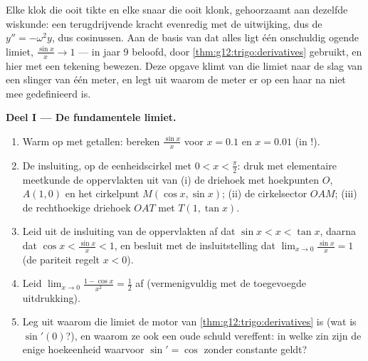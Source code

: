 \begin{problem}
\label{pb:g12:trigo:1}
Elke klok die ooit tikte en elke snaar die ooit klonk, gehoorzaamt aan
dezelfde wiskunde: een terugdrijvende kracht evenredig met de uitwijking, dus
de  $y'' = -\omega^2 y$, dus cosinussen. Aan de basis van dat
alles ligt één onschuldig ogende limiet, $\frac{\sin x}{x} \to 1$ --- in jaar
9 beloofd, door \cref{thm:g12:trigo:derivatives} gebruikt, en hier met een
tekening bewezen. Deze opgave klimt van die limiet naar de slag van een
slinger van één meter, en legt uit waarom de meter er op een haar na niet mee
gedefinieerd is.

\medskip
\noindent\textbf{Deel I --- De fundamentele limiet.}
\begin{enumerate}
  \item Warm op met getallen: bereken $\frac{\sin x}{x}$ voor $x = 0.1$ en
        $x = 0.01$ (in !).
  \item De insluiting, op de eenheidscirkel met $0 < x < \frac\pi2$: druk met
        elementaire meetkunde de oppervlakten uit van (i) de driehoek met
        hoekpunten $O$, $A(1,0)$ en het cirkelpunt $M(\cos x, \sin x)$;
        (ii) de cirkelsector $OAM$; (iii) de rechthoekige driehoek $OAT$ met
        $T(1, \tan x)$.
  \item Leid uit de insluiting van de oppervlakten af dat
        $\sin x < x < \tan x$, daarna dat $\cos x < \frac{\sin x}{x} < 1$, en
        besluit met de insluitstelling dat
        $\lim_{x \to 0} \frac{\sin x}{x} = 1$ (de pariteit regelt $x < 0$).
  \item Leid $\lim_{x \to 0} \frac{1 - \cos x}{x^2} = \frac12$ af
        (vermenigvuldig met de toegevoegde uitdrukking).
  \item Leg uit waarom die limiet de motor van
        \cref{thm:g12:trigo:derivatives} is (wat is $\sin'(0)$?), en waarom
        ze ook een oude schuld vereffent: in welke zin zijn \emph{}
        de enige hoekeenheid waarvoor $\sin' = \cos$ zonder constante geldt?
\end{enumerate}


\end{problem}
